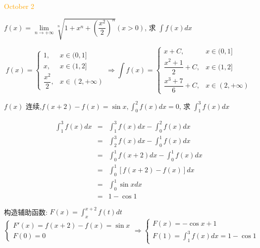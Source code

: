 \textcolor{orange}{October 2}

\begin{example}[][Exam: 36.1.3]
	$f(x)=\lim\limits_{n\to+\infty}\sqrt[n]{1+x^n+\left( \dfrac{x^2}{2}\right) ^n}(x>0)$, 求 $\int f(x)dx$
\end{example}

\begin{solution}
 
	$$f(x)=
	\begin{cases}
		1, &x\in(0,1]\\
		x, &x\in(1,2]\\
		\dfrac{x^2}{2}, &x\in(2,+\infty)  
	\end{cases}
	\Rightarrow 
	\int f(x)=
	\begin{cases}
		x+C, &x\in(0,1] \\
		\dfrac{x^2+1}{2}+C, &x\in(1,2] \\
		\dfrac{x^3+7}{6}+C, &x\in(2,+\infty)
	\end{cases}$$
\end{solution}

\begin{example}[][Exam: 36.1.4]
	$f(x)$ 连续,$f(x+2)-f(x)=\sin x, \displaystyle{\int_{0}^{2}f(x)dx=0}$, 求 $\displaystyle{\int_{1}^{3}f(x)dx}$
\end{example}

\begin{solution}

	\begin{eqnarray*}
		\int_{1}^{3}f(x)dx
		& = & \int_{1}^{3}f(x)dx-\int_{0}^{2}f(x)dx \\
		& = & \int_{2}^{3}f(x)dx-\int_{0}^{1}f(x)dx \\
		& = & \int_{0}^{1}f(x+2)dx-\int_{0}^{1}f(x)dx \\
		& = & \int_{0}^{1}[f(x+2)-f(x)]dx \\
		& = & \int_{0}^{1}\sin xdx \\
		& = & 1-\cos 1
	\end{eqnarray*}
\end{solution}
\begin{anymark}[注]
	构造辅助函数: $\displaystyle{F(x)=\int_{x}^{x+2}f(t)dt}$  
	$$\begin{cases}
		F'(x) = f(x+2)-f(x) = \sin x\\
		F(0)  = 0
	\end{cases}\Rightarrow
	\begin{cases}
		F(x) = -\cos x+1 \\
		\displaystyle {F(1) = \int_{1}^{3}f(x)dx=1-\cos 1}
	\end{cases}$$
	\end{anymark}


